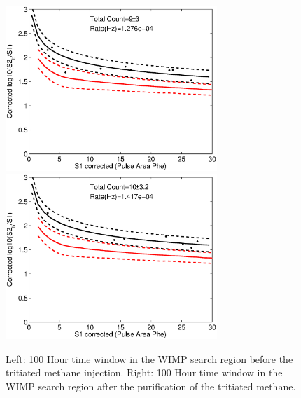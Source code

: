 \begin{figure}[H]\centering
\includegraphics[width=80mm]{CH3T_fid_30_before_100_18_lux10_20130813T1120_cp05328_note.eps}
\includegraphics[width=80mm]{CH3T_fid_30_after_100_18_afterlux10_20130813T1120_cp05328_note.eps}
\caption{Left: 100 Hour time window in the WIMP search region before the tritiated methane injection. Right: 100 Hour time window in the WIMP search region after the purification of the tritiated methane. }
\label{fig:Removal_2}
\end{figure}

